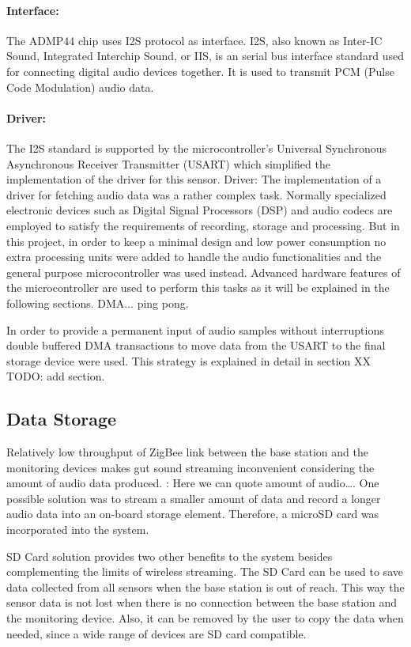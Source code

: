 \paragraph*{Interface:} The ADMP44 chip uses I2S protocol as interface. I2S, also known as Inter-IC Sound, Integrated Interchip Sound, or IIS, is an serial bus interface standard used for connecting digital audio devices together. It is used to transmit PCM (Pulse Code Modulation) audio data.

\paragraph*{Driver:} The I2S standard is supported by the microcontroller’s Universal Synchronous Asynchronous Receiver Transmitter (USART) which simplified the implementation of the driver for this sensor.
Driver: The implementation of a driver for fetching audio data was a rather complex task. 
Normally specialized electronic devices such as Digital Signal Processors (DSP) and audio codecs are employed to satisfy the requirements of recording, storage and processing. But in this project, in order to keep a minimal design and low power consumption no extra processing units were added to handle the audio functionalities and the general purpose microcontroller was used instead. 
Advanced hardware features of the microcontroller are used to perform this tasks as it will be 
 explained in the following sections.
DMA... ping pong.

In order to provide a permanent input of audio samples without interruptions double buffered DMA transactions to move data from the USART to the final storage device were used. This strategy is explained in detail in section XX TODO: add section. 




\subsection{Data Storage}
Relatively low throughput of ZigBee link between the base station and the monitoring devices makes gut sound streaming inconvenient considering the amount of audio data produced. \TODO{}: Here we can quote amount of audio\ldots. One possible solution was to stream a smaller amount of data and record a longer audio data into an on-board storage element. Therefore, a microSD card was incorporated into the system. 

SD Card solution provides two other benefits to the system besides complementing the limits of wireless streaming. The SD Card can be used to save data collected from all sensors when the base station is out of reach. This way the sensor data is not lost when there is no connection between the base station and the monitoring device. Also, it can be removed by the user to copy the data when needed, since a wide range of devices are SD card compatible.  

